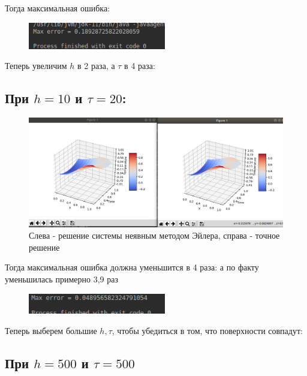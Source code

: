 \documentclass[12pt,a4paper]{scrartcl}
\begin{document}
Тогда максимальная ошибка: 

\begin{figure}[h!]
    \centering
    \includegraphics[width=6cm]{heat_equation_implicit_Euler/images/error1.PNG}
\end{figure}

Теперь увеличим $h$ в 2 раза, а $\tau$ в 4 раза: 

\subsection*{При $h = 10$ и $\tau = 20$:}

\begin{figure}[h!]
    \centering
    \includegraphics[width=14cm]{heat_equation_implicit_Euler/images/t20h10.png}
    \caption{Слева - решение системы неявным методом Эйлера,
                справа - точное решение}
\end{figure}

Тогда максимальная ошибка должна уменьшится в 4 раза: а по факту уменьшилась примерно 3,9 раз 

\begin{figure}[h!]
    \centering
    \includegraphics[width=6cm]{heat_equation_implicit_Euler/images/error2.png}
\end{figure}

Теперь выберем большие $h,\tau$, чтобы убедиться в том, что поверхности совпадут: 

\subsection*{При $h = 500$ и $\tau = 500$} 
\end{document}

